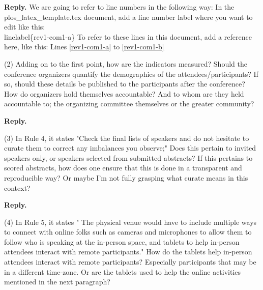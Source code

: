 \documentclass{article}
\newenvironment{Reply}{\noindent\color{BlueViolet}\textbf{Reply.}}{\vspace{1em}}
\begin{document}
\begin{Reply}
   We are going to refer to line numbers in the following way: In the plos\_latex\_template.tex document, add a line number label where you want to edit like this: \\ linelabel\{rev1-com1-a\}
   To refer to these lines in this document, add a reference here, like this: Lines   \ref{rev1-com1-a} to \ref{rev1-com1-b}
\end{Reply}

(2) Adding on to the first point, how are the indicators measured? Should the conference organizers quantify the demographics of the attendees/participants? If so, should these details be published to the participants after the conference? How do organizers hold themselves accountable? And to whom are they held accountable to; the organizing committee themselves or the greater community?

\begin{Reply}
   
\end{Reply}

(3) In Rule 4, it states "Check the final lists of speakers and do not hesitate to curate them to correct any imbalances you observe;" Does this pertain to invited speakers only, or speakers selected from submitted abstracts? If this pertains to scored abstracts, how does one ensure that this is done in a transparent and reproducible way? Or maybe I'm not fully grasping what curate means in this context?

\begin{Reply}
   
\end{Reply}

(4) In Rule 5, it states " The physical venue would have to include multiple ways to connect with online folks such as cameras and microphones to allow them to follow who is speaking at the in-person space, and tablets to help in-person attendees interact with remote participants." How do the tablets help in-person attendees interact with remote participants? Especially participants that may be in a different time-zone. Or are the tablets used to help the online activities mentioned in the next paragraph?
\end{document}
